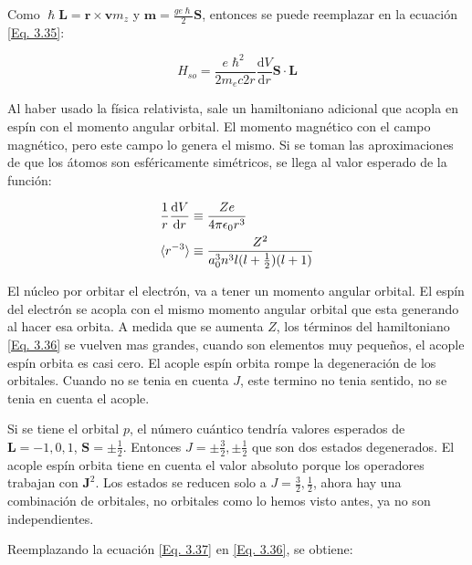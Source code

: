 \documentclass[11pt,fleqn]{book}
\renewcommand{\vec}[1]{\mathbf{#1}}
\begin{document}
Como $\hslash\vec{L}=\vec{r}\times\vec{v}m_{z}$ y $\vec{m}=\frac{ge\hslash}{2}\vec{S}$, entonces se puede reemplazar en la ecuación \ref{Eq. 3.35}:

\begin{equation}
    H_{so}=\frac{e\hslash^{2}}{2m_{e}c{2}r}\frac{\mathrm{d}V}{\mathrm{d}r}\vec{S}\cdot\vec{L}
    \label{Eq. 3.36}
\end{equation}

Al haber usado la física relativista, sale un hamiltoniano adicional que acopla en espín con el momento angular orbital. El momento magnético con el campo magnético, pero este campo lo genera el mismo. Si se toman las aproximaciones de que los átomos son esféricamente simétricos, se llega al valor esperado de la función:

\begin{equation}
    \begin{split}
        \frac{1}{r}\frac{\mathrm{d}V}{\mathrm{d}r}&\equiv\frac{Ze}{4\pi\epsilon_{0}r^{3}}\\
        \braket{r^{-3}}&\equiv\frac{Z^{2}}{a_{0}^{3}n^{3}l(l+\frac{1}{2})(l+1)}
        \label{Eq. 3.37}
    \end{split}
\end{equation}

El núcleo por orbitar el electrón, va a tener un momento angular orbital. El espín del electrón se acopla con el mismo momento angular orbital que esta generando al hacer esa orbita. A medida que se aumenta $Z$, los términos del hamiltoniano \ref{Eq. 3.36} se vuelven mas grandes, cuando son elementos muy pequeños, el acople espín orbita es casi cero. El acople espín orbita rompe la degeneración de los orbitales. Cuando no se tenia en cuenta $J$, este termino no tenia sentido, no se tenia en cuenta el acople. 

\begin{example}[$\vec{J}=\vec{L}+\vec{S}$]
Si se tiene el orbital $p$, el número cuántico tendría valores esperados de $\vec{L}=-1,0,1$, $\vec{S}=\pm\frac{1}{2}$. Entonces $J=\pm\frac{3}{2}, \pm\frac{1}{2}$ que son dos estados degenerados. El acople espín orbita tiene en cuenta el valor absoluto porque los operadores trabajan con $\vec{J}^{2}$. Los estados se reducen solo a $J=\frac{3}{2}, \frac{1}{2}$, ahora hay una combinación de orbitales, no orbitales como lo hemos visto antes, ya no son independientes.
\end{example}

Reemplazando la ecuación \ref{Eq. 3.37} en \ref{Eq. 3.36}, se obtiene:
\end{document}
